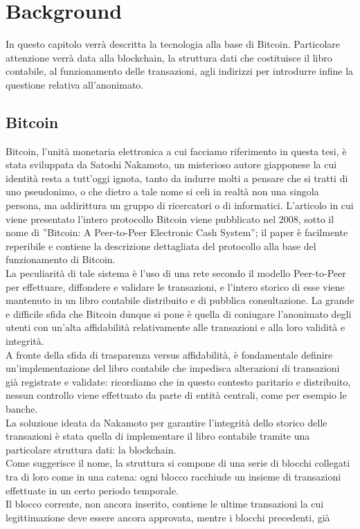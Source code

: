 \chapter{Background}
In questo capitolo verrà descritta la tecnologia alla base di Bitcoin. Particolare attenzione verrà data alla blockchain, la struttura dati che costituisce il libro contabile, al funzionamento delle transazioni, agli indirizzi per introdurre infine la questione relativa all'anonimato. 
\section{Bitcoin}
Bitcoin, l’unità monetaria elettronica a cui facciamo riferimento in questa tesi, è stata sviluppata da Satoshi Nakamoto, un misterioso autore giapponese la cui identità resta a tutt'oggi ignota, tanto da indurre molti a pensare che si tratti di uno pseudonimo, o che dietro a tale nome si celi in realtà non una singola persona, ma addirittura un gruppo di ricercatori o di informatici. L’articolo in cui viene presentato l’intero protocollo Bitcoin viene pubblicato nel 2008, sotto il nome di ”Bitcoin: A Peer-to-Peer Electronic Cash System”\cite{nakamoto2009bitcoin}; il paper è facilmente reperibile e contiene la descrizione dettagliata del protocollo alla base del funzionamento di Bitcoin.\\La peculiarità di tale sistema è l’uso di una rete secondo il modello Peer-to-Peer per effettuare, diffondere e validare le transazioni, e l’intero storico di esse viene mantenuto in un libro contabile distribuito e di pubblica consultazione. La grande e difficile sfida che Bitcoin dunque si pone è quella di coniugare l’anonimato degli utenti con un’alta affidabilità relativamente alle transazioni e alla loro validità e integrità.\\A fronte della sfida di trasparenza versus affidabilità, è fondamentale definire un’implementazione del libro contabile che impedisca alterazioni di transazioni già registrate e validate: ricordiamo che in questo contesto paritario e distribuito, nessun controllo viene effettuato da parte di entità centrali, come per esempio le banche.\\
La soluzione ideata da Nakamoto per garantire l’integrità dello storico delle transazioni è stata quella di implementare il libro contabile tramite una particolare struttura dati: la blockchain.\\Come suggerisce il nome, la struttura si compone di una serie di blocchi collegati tra di loro come in una catena: ogni blocco racchiude un insieme di transazioni effettuate in un certo periodo temporale.\\Il blocco corrente, non ancora inserito, contiene le ultime transazioni la cui legittimazione deve essere ancora approvata, mentre i blocchi precedenti, già
